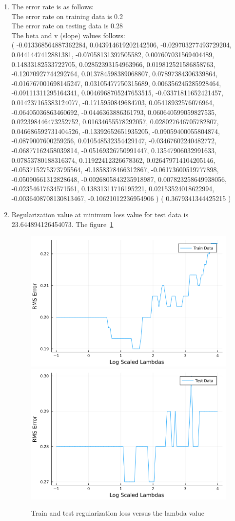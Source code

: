 \documentclass{article}
\begin{document}
    \begin{enumerate}
        \item The error rate is as follows:\\
        The error rate on training data is 0.2\\
        The error rate on testing data is 0.28\\
        The beta and v (slope) values follows:\\
        ( -0.013368564887362284, 0.043914619202142506, -0.029703277493729204, 0.0441447412881381, -0.07058131397505582, 0.007607031569404489, 0.14833182533722705, 0.02852393154963966, 0.019812521586858763, -0.12070927744292764, 0.013784598389068807, 0.07897384306339864, -0.016767001698145247, 0.03105477750315689, 0.006356245285928464, -0.09111311295164341, 0.0046968705247653515, -0.03371811652421457, 0.014237165383124077, -0.1715950849684703, 0.05418932576076964, -0.06405036863460692, -0.0446363886361793, 0.060640599059827535, 0.022398446473252752, 0.01634655578292057, 0.028027646705782807, 0.046686592731404526, -0.13392652651935205, -0.09059400055804874, -0.0879007600259256, 0.010548532354429147, -0.03467602240482772, -0.06877162458039814, -0.05169326750991447, 0.13547906032991633, 0.07853780188316374, 0.11922412326678362, 0.026479714104205146, -0.053715275373795564, -0.1858378466312867, -0.06173600519777898, -0.05090661312828648, -0.0026805843235918987, 0.007823258649938056, -0.02354617634571561, 0.13831311716195221, 0.02153524018622994, -0.0036408708130813467, -0.10621012236954906 ) ( 0.3679341344425215 )
        \item Regularization value at minimum loss value for test data is 23.644894126454073. The figure~\ref{fig:train_test_reg}
        \begin{figure}[htp]
            \centering
            \includegraphics[width=.50\textwidth]{15.2.b.1.png}\hfill
            \includegraphics[width=.50\textwidth]{15.2.b.2.png}\hfill
            \caption{Train and test regularization loss versus the lambda value}
            \label{fig:train_test_reg}
        \end{figure}
    \end{enumerate}
    
\end{document}
